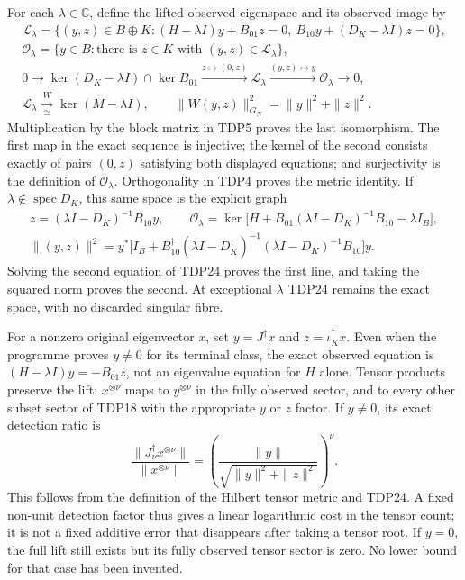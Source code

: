 For each $\lambda\in\mathbb C$, define the lifted observed eigenspace
and its observed image by
\begin{equation}\tag{TDP24}
\begin{gathered}
\mathscr L_\lambda=
 \{(y,z)\in B\oplus K:
 (H-\lambda I)y+B_{01}z=0,
 \ B_{10}y+(D_K-\lambda I)z=0\},\\
\mathscr O_\lambda=\{y\in B:\text{there is }z\in K
 \text{ with }(y,z)\in\mathscr L_\lambda\},\\
0\longrightarrow\ker(D_K-\lambda I)\cap\ker B_{01}
 \xrightarrow{z\mapsto(0,z)}\mathscr L_\lambda
 \xrightarrow{(y,z)\mapsto y}\mathscr O_\lambda\longrightarrow0,\\
\mathscr L_\lambda\xrightarrow[\cong]{\ W\ }\ker(M-\lambda I),
\qquad\|W(y,z)\|_{G_N}^2=\|y\|^2+\|z\|^2.
\end{gathered}
\end{equation}
Multiplication by the block matrix in TDP5 proves the last isomorphism.
The first map in the exact sequence is injective; the kernel of the
second consists exactly of pairs $(0,z)$ satisfying both displayed
equations; and surjectivity is the definition of $\mathscr O_\lambda$.
Orthogonality in TDP4 proves the metric identity. If
$\lambda\notin\operatorname{spec}D_K$, this same space is the explicit
graph
\begin{equation}\tag{TDP25}
\begin{gathered}
z=(\lambda I-D_K)^{-1}B_{10}y,\qquad
\mathscr O_\lambda=
\ker\bigl[H+B_{01}(\lambda I-D_K)^{-1}B_{10}-\lambda I_B\bigr],\\
\|(y,z)\|^2=
y^*\bigl[I_B+B_{10}^\dagger(\bar\lambda I-D_K^\dagger)^{-1}
 (\lambda I-D_K)^{-1}B_{10}\bigr]y.
\end{gathered}
\end{equation}
Solving the second equation of TDP24 proves the first line, and taking
the squared norm proves the second. At exceptional $\lambda$ TDP24
remains the exact space, with no discarded singular fibre.

For a nonzero original eigenvector $x$, set $y=J^\dagger x$ and
$z=\iota_K^\dagger x$. Even when the programme proves $y\ne0$ for its
terminal class, the exact observed equation is
$(H-\lambda I)y=-B_{01}z$, not an eigenvalue equation for $H$ alone.
Tensor products preserve the lift: $x^{\otimes\nu}$ maps to
$y^{\otimes\nu}$ in the fully observed sector, and to every other
subset sector of TDP18 with the appropriate $y$ or $z$ factor.
If $y\ne0$, its exact detection ratio is
\begin{equation}\tag{TDP26}
\frac{\|J_\nu^\dagger x^{\otimes\nu}\|}{\|x^{\otimes\nu}\|}
 =\left(\frac{\|y\|}{\sqrt{\|y\|^2+\|z\|^2}}\right)^\nu.
\end{equation}
This follows from the definition of the Hilbert tensor metric and
TDP24. A fixed non-unit detection factor thus gives a linear logarithmic
cost in the tensor count; it is not a fixed additive error that disappears
after taking a tensor root. If $y=0$, the full lift still exists but its
fully observed tensor sector is zero. No lower bound for that case has
been invented.

